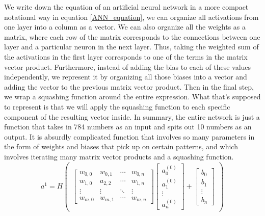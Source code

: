 \documentclass[master]{thesis-uestc}
\begin{document}
We write down the equation of an artificial neural network in a more compact notational way in equation \ref{ANN_equation}, we can organize all activations from one layer into a column as a vector. We can also organize all the weights as a matrix, where each row of the matrix corresponds to the connections between one layer and a particular neuron in the next layer. Thus, taking the weighted sum of the activations in the first layer corresponds to one of the terms in the matrix vector product. Furthermore, instead of adding the bias to each of these values independently, we represent it by organizing all those biases into a vector and adding the vector to the previous matrix vector product. Then in the final step, we wrap a squashing function around the entire expression. What that's supposed to represent is that we will apply the squashing function to each specific component of the resulting vector inside. In summary, the entire network is just a function that takes in 784 numbers as an input and spits out 10 numbers as an output. It is absurdly complicated function that involves so many parameters in the form of weights and biases that pick up on certain patterns, and which involves iterating many matrix vector products and a squashing function.
\begin{equation}
    a^1 = 
H\begin{pmatrix}\begin{bmatrix}
  w_{0,0} & w_{0,1} & \cdots & w_{0,n} \\
  w_{1,0} & a_{2,2} & \cdots & w_{1,n} \\
  \vdots  & \vdots  & \ddots & \vdots  \\
  w_{m,0} & w_{m,1} & \cdots & w_{m,n} 
 \end{bmatrix}
 \begin{bmatrix}
  a_0^{(0)} \\
  a_1^{(0)} \\
  \vdots \\
  a_n^{(0)} 
 \end{bmatrix} + 
 \begin{bmatrix}
  b_0 \\
  b_1 \\
  \vdots \\
  b_n 
 \end{bmatrix}\end{pmatrix}
 \label{ANN_equation}
\end{equation}
\end{document}
